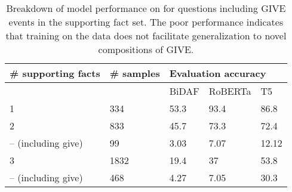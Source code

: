 \begin{table}[]
\small
\begin{tabular}{@{}lllll@{}}
\toprule
\# supporting facts & \# samples & \multicolumn{3}{l}{Evaluation accuracy} \\ \midrule
                    &            & BiDAF       & RoBERTa      & T5         \\
1                   & 334        & 53.3        & 93.4         & 86.8       \\
2                   & 833        & 45.7        & 73.3         & 72.4       \\
-- (including give)  & 99         & 3.03        & 7.07         & 12.12      \\
3                   & 1832       & 19.4        & 37           & 53.8       \\
-- (including give)  & 468        & 4.27        & 7.05         & 30.3       \\ \bottomrule
\end{tabular}
\caption{\label{tab:exp_1_breakdown} Breakdown of model performance on  for questions including GIVE events in the supporting fact set. The poor performance indicates that training on the \babibm data does not facilitate generalization to novel compositions of GIVE.}
\end{table}